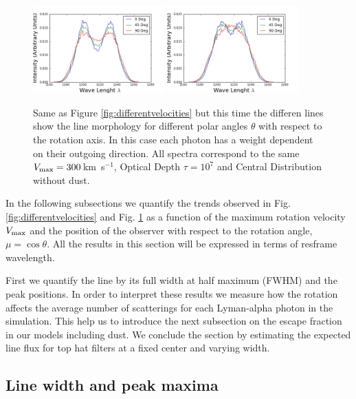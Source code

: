 \documentclass[usenatbib]{mn2e}
\newcommand{\kms}{\,km~s$^{-1}$}
\begin{document}
\begin{figure}
\includegraphics[width=0.45\textwidth]{Observers7t.png}
\includegraphics[width=0.45\textwidth]{Observers7tHOM.png}
\caption{Same as Figure \ref{fig:differentvelocities} but this time
  the differen lines show the line morphology for different polar angles
  $\theta$ with respect to the rotation axis. In this case each photon
  has a weight dependent on their outgoing direction. All spectra correspond
  to the same $V_{\rm max}=300$\kms, Optical   Depth $\tau=10^{7}$ and
  Central Distribution without dust.}  
  \label{fig:differentobservers}
\end{figure}


In the following subsections we quantify the trends observed in
Fig. \ref{fig:differentvelocities} and
Fig. \ref{fig:differentobservers} as a function of the maximum
rotation velocity $V_{\rm max}$ and the position of the observer with
respect to the rotation angle, $\mu = \cos{\theta}$. All the results
in this section will be expressed in terms of resframe wavelength.

First we quantify the line by its full width at half maximum
(FWHM) and the peak positions. In order to interpret these results we
measure how the rotation affects the average number of scatterings
for each Lyman-alpha photon in the simulation. This help us to
introduce the next subsection on the escape fraction in our models
including dust. We conclude the section by estimating the
expected line flux for top hat filters at a fixed center and varying
width. 

\subsection{Line width and peak maxima}
\label{sec:widthpeak}
\end{document}
